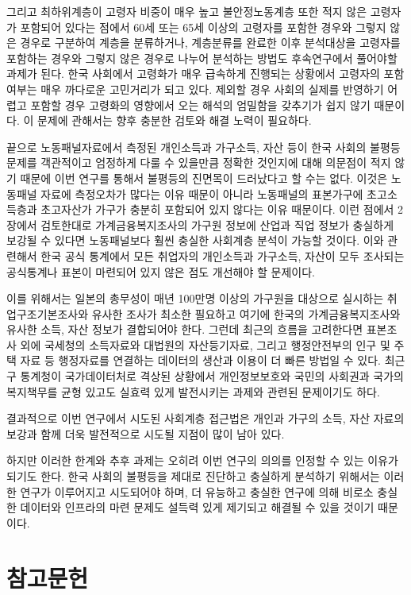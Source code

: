 \documentclass[
  letterpaper,
  DIV=11,
  numbers=noendperiod]{scrartcl}
\begin{document}
그리고 최하위계층이 고령자 비중이 매우 높고 불안정노동계층 또한 적지
않은 고령자가 포함되어 있다는 점에서 60세 또는 65세 이상의 고령자를
포함한 경우와 그렇지 않은 경우로 구분하여 계층을 분류하거나, 계층분류를
완료한 이후 분석대상을 고령자를 포함하는 경우와 그렇지 않은 경우로
나누어 분석하는 방법도 후속연구에서 풀어야할 과제가 된다. 한국 사회에서
고령화가 매우 급속하게 진행되는 상황에서 고령자의 포함 여부는 매우
까다로운 고민거리가 되고 있다. 제외할 경우 사회의 실제를 반영하기 어렵고
포함할 경우 고령화의 영향에서 오는 해석의 엄밀함을 갖추기가 쉽지 않기
때문이다. 이 문제에 관해서는 향후 충분한 검토와 해결 노력이 필요하다.

끝으로 노동패널자료에서 측정된 개인소득과 가구소득, 자산 등이 한국
사회의 불평등문제를 객관적이고 엄정하게 다룰 수 있을만큼 정확한 것인지에
대해 의문점이 적지 않기 때문에 이번 연구를 통해서 불평등의 진면목이
드러났다고 할 수는 없다. 이것은 노동패널 자료에 측정오차가 많다는 이유
때문이 아니라 노동패널의 표본가구에 초고소득층과 초고자산가 가구가
충분히 포함되어 있지 않다는 이유 때문이다. 이런 점에서 2장에서
검토한대로 가계금융복지조사의 가구원 정보에 산업과 직업 정보가 충실하게
보강될 수 있다면 노동패널보다 훨씬 충실한 사회계층 분석이 가능할 것이다.
이와 관련해서 한국 공식 통계에서 모든 취업자의 개인소득과 가구소득,
자산이 모두 조사되는 공식통계나 표본이 마련되어 있지 않은 점도 개선해야
할 문제이다.

이를 위해서는 일본의 총무성이 매년 100만명 이상의 가구원을 대상으로
실시하는 취업구조기본조사와 유사한 조사가 최소한 필요하고 여기에 한국의
가계금융복지조사와 유사한 소득, 자산 정보가 결합되어야 한다. 그런데
최근의 흐름을 고려한다면 표본조사 외에 국세청의 소득자료와 대법원의
자산등기자료, 그리고 행정안전부의 인구 및 주택 자료 등 행정자료를
연결하는 데이터의 생산과 이용이 더 빠른 방법일 수 있다. 최근 구 통계청이
국가데이터처로 격상된 상황에서 개인정보보호와 국민의 사회권과 국가의
복지책무를 균형 있고도 실효력 있게 발전시키는 과제와 관련된 문제이기도
하다.

결과적으로 이번 연구에서 시도된 사회계층 접근법은 개인과 가구의 소득,
자산 자료의 보강과 함께 더욱 발전적으로 시도될 지점이 많이 남아 있다.

하지만 이러한 한계와 추후 과제는 오히려 이번 연구의 의의를 인정할 수
있는 이유가 되기도 한다. 한국 사회의 불평등을 제대로 진단하고 충실하게
분석하기 위해서는 이러한 연구가 이루어지고 시도되어야 하며, 더 유능하고
충실한 연구에 의해 비로소 충실한 데이터와 인프라의 마련 문제도 설득력
있게 제기되고 해결될 수 있을 것이기 때문이다.

\section*{참고문헌}\label{uxcc38uxace0uxbb38uxd5cc}
\end{document}
